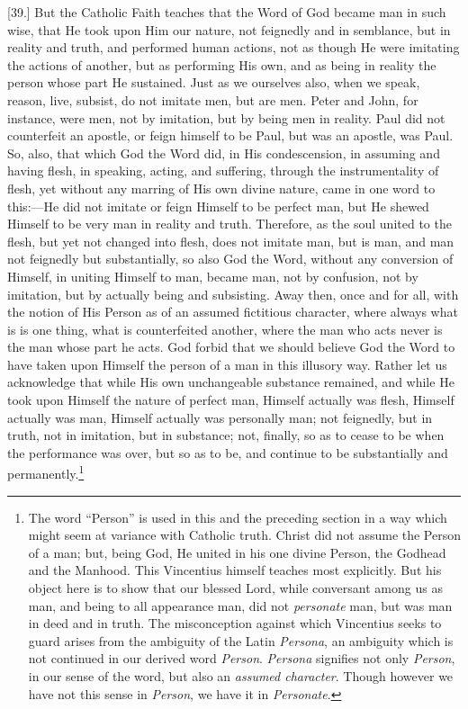 [39.] But the Catholic Faith teaches that the Word of God became man in such wise, that He took upon Him our nature, not feignedly and in semblance, but in reality and truth, and performed human actions, not as though He were imitating the actions of another, but as performing His own, and as being in reality the person whose part He sustained. Just as we ourselves also, when we speak, reason, live, subsist, do not imitate men, but are men. Peter and John, for instance, were men, not by imitation, but by being men in reality. Paul did not counterfeit an apostle, or feign himself to be Paul, but was an apostle, was Paul. So, also, that which God the Word did, in His condescension, in assuming and having flesh, in speaking, acting, and suffering, through the instrumentality of flesh, yet without any marring of His own divine nature, came in one word to this:—He did not imitate or feign Himself to be perfect man, but He shewed Himself to be very man in reality and truth. Therefore, as the soul united to the flesh, but yet not changed into flesh, does not imitate man, but is man, and man not feignedly but substantially, so also God the Word, without any conversion of Himself, in uniting Himself to man, became man, not by confusion, not by imitation, but by actually being and subsisting. Away then, once and for all, with the notion of His Person as of an assumed fictitious character, where always what is is one thing, what is counterfeited another, where the man who acts never is the man whose part he acts. God forbid that we should believe God the Word to have taken upon Himself the person of a man in this illusory way. Rather let us acknowledge that while His own unchangeable substance remained, and while He took upon Himself the nature of perfect man, Himself actually was flesh, Himself actually was man, Himself actually was personally man; not feignedly, but in truth, not in imitation, but in substance; not, finally, so as to cease to be when the performance was over, but so as to be, and continue to be substantially and permanently.\footnote{The word “Person” is used in this and the preceding section in a way which might seem at variance with Catholic truth. Christ did not assume the Person of a man; but, being God, He united in his one divine Person, the Godhead and the Manhood. This Vincentius himself teaches most explicitly. But his object here is to show that our blessed Lord, while conversant among us as man, and being to all appearance man, did not \emph{personate} man, but was man in deed and in truth. The misconception against which Vincentius seeks to guard arises from the ambiguity of the Latin \emph{Persona}, an ambiguity which is not continued in our derived word \emph{Person}. \emph{Persona} signifies not only \emph{Person}, in our sense of the word, but also an \emph{assumed character}. Though however we have not this sense in \emph{Person}, we have it in \emph{Personate}.}

